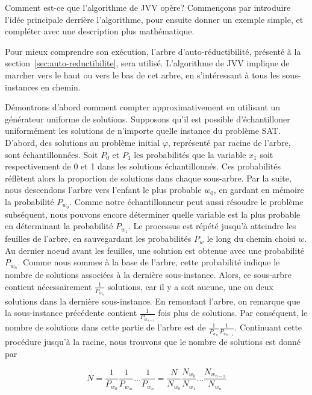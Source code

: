 Comment est-ce que l'algorithme de JVV opère? Commençons par introduire l'idée principale derrière l'algorithme, pour ensuite donner un exemple simple, et compléter avec une description plus mathématique. 

Pour mieux comprendre son exécution, l'arbre d'auto-réductibilité, présenté à la section~\ref{sec:auto-reductibilite}, sera utilisé. L'algorithme de JVV implique de marcher vers le haut ou vers le bas de cet arbre, en s'intéressant à tous les sous-instances en chemin.

Démontrons d'abord comment compter approximativement en utilisant un générateur uniforme de solutions. Supposons qu'il est possible d'échantilloner uniformément les solutions de n'importe quelle instance du problème SAT. D'abord, des solutions au problème initial $\varphi$, représenté par racine de l'arbre, sont échantillonnées. Soit $P_{0}$ et $P_{1}$ les probabilités que la variable $x_{1}$ soit respectivement de 0 et 1 dans les solutions échantillonnés. Ces probabilités réflètent alors la proportion de solutions dans chaque sous-arbre. Par la suite, nous descendons l'arbre vers l'enfant le plus probable $w_{0}$, en gardant en mémoire la probabilité $P_{w_{0}}$. Comme notre échantillonneur peut aussi résoudre le problème subséquent, nous pouvons encore déterminer quelle variable est la plus probable en déterminant la probabilité $P_{w_{1}}$. Le processus est répété jusqu'à atteindre les feuilles de l'arbre, en sauvegardant les probabilités $P_{w}$ le long du chemin choisi $w$. Au dernier noeud avant les feuilles, une solution est obtenue avec une probabilité $P_{w_{n}}$. Comme nous sommes à la base de l'arbre, cette probabilité indique le nombre de solutions associées à la dernière sous-instance. Alors, ce sous-arbre contient nécessairement $\frac{1}{P_{w_{n}}}$ solutions, car il y a soit aucune, une ou deux solutions dans la dernière sous-instance. En remontant l'arbre, on remarque que la sous-instance précédente contient $\frac{1}{P_{w_{n-1}}}$ fois plus de solutions. Par conséquent, le nombre de solutions dans cette partie de l'arbre est de $\frac{1}{P_{w_{n}}} \frac{1}{P_{w_{n-1}}}$. Continuant cette procédure jusqu'à la racine, nous trouvons que le nombre de solutions est donné par 


\begin{equation}
    N = \frac{1}{P_{w_{0}}} \frac{1}{P_{w_{m}}} \dots \frac{1}{P_{w_{n}}} = \frac{N}{N_{w_{0}}} \frac{N_{w_{0}}}{N_{w_{1}}} \dots \frac{N_{w_{n-1}}}{N_{w_{n}}}
\end{equation}

